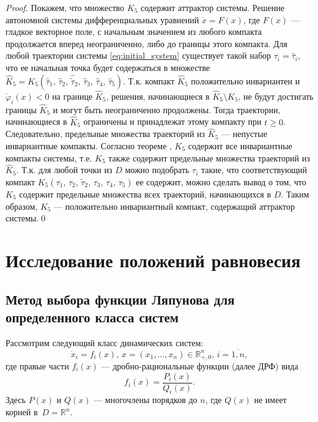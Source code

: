 \documentclass[14pt,a4paper]{extarticle}
\begin{document}
\begin{proof}
		Покажем, что множество $K_5$ содержит аттрактор системы. Решение автономной системы дифференциальных уравнений $\dot{x}=F(x)$, где $F(x)$ --- гладкое векторное поле, с начальным значением из любого компакта продолжается вперед неограниченно, либо до границы этого компакта\cite[с.~84]{Arnold}. Для любой траектории системы \ref{eq:initial_system} существует такой набор $\tau_i = \hat{\tau}_i$, что ее начальная точка будет содержаться в множестве $\hat{K}_5 = K_5(\hat\tau_1,\,\hat\tau_2,\,\hat{\tilde{\tau}}_2,\,\hat\tau_3,\,\hat\tau_4,\,\hat\tau_5)$. Т.к. компакт $\hat{K}_5$ положительно инвариантен и $\dot{\varphi}_i(x)<0$ на границе $\hat{K}_5$, решения, начинающиеся в $\hat{K}_5\setminus K_5$, не будут достигать границы $\hat{K}_5$ и могут быть неограниченно продолжены. Тогда траектории, начинающиеся в $\hat{K}_5$ ограничены и принадлежат этому компакту при $t\ge0$. Следовательно, предельные множества траекторий из $\hat{K}_5$ --- непустые инвариантные компакты. Согласно теореме , $K_5$ содержит все инвариантные компакты системы, т.е. $K_5$ также содержит предельные множества траекторий из $\hat{K}_5$. Т.к. для любой точки из $D$ можно подобрать $\tau_i$ такие, что соответствующий компакт $K_5(\tau_1,\,\tau_2,\,\tilde{\tau}_2,\,\tau_3,\,\tau_4,\,\tau_5)$ ее содержит, можно сделать вывод о том, что $K_5$ содержит предельные множества всех траекторий, начинающихся в $D$. Таким образом, $K_5$ --- положительно инвариантный компакт, содержащий аттрактор системы.\qed
		
	\end{proof}	
	
	\section{Исследование положений равновесия}
	\subsection{Метод выбора функции Ляпунова для определенного класса систем}
	
	Рассмотрим следующий класс динамических систем:
	\[\dot{x}_i=f_i(x),\, x=(x_1,\dots,x_n)\in\mathbb{R}^{n}_{+,0},\, i=\overline{1,n},\]
	где правые части $f_i(x)$ --- дробно-рациональные функции (далее ДРФ) вида 
	\begin{equation*}
		f_i(x)=\dfrac{P_i(x)}{Q_i(x)}.
	\end{equation*}
	Здесь $P(x)$ и $Q(x)$ --- многочлены порядков до $n$, где $Q(x)$ не имеет корней в~$D = \mathbb{R}^n$. 
	
\end{document}
